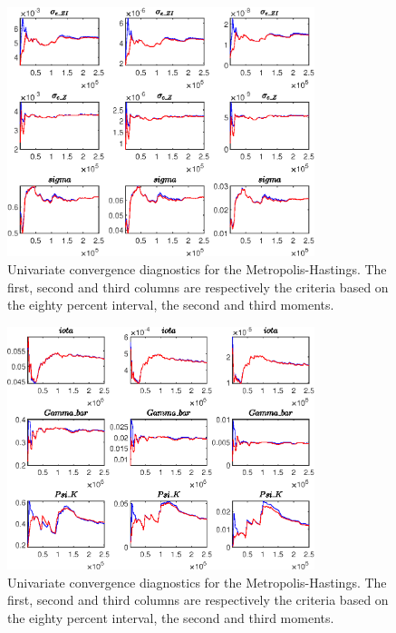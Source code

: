  
\begin{figure}[H]
\centering 
\includegraphics[width=0.80\textwidth]{two_sector_RBC_differentiated_est/Output/two_sector_RBC_differentiated_est_udiag1}
\caption{Univariate convergence diagnostics for the Metropolis-Hastings.
The first, second and third columns are respectively the criteria based on
the eighty percent interval, the second and third moments.}\label{Fig:UnivariateDiagnostics:1}
\end{figure}

\begin{figure}[H]
\centering 
\includegraphics[width=0.80\textwidth]{two_sector_RBC_differentiated_est/Output/two_sector_RBC_differentiated_est_udiag2}
\caption{Univariate convergence diagnostics for the Metropolis-Hastings.
The first, second and third columns are respectively the criteria based on
the eighty percent interval, the second and third moments.}\label{Fig:UnivariateDiagnostics:2}
\end{figure}


